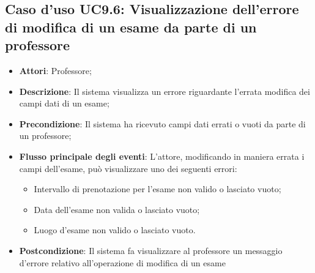 \subsection{Caso d'uso \texorpdfstring{UC9.6}{UC9.6}: Visualizzazione dell'errore di modifica di un esame da parte di un professore}
\begin{itemize}
	\item \textbf{Attori}: Professore;
	\item \textbf{Descrizione}: Il sistema visualizza un errore riguardante l'errata modifica dei campi dati di un esame;
	\item \textbf{Precondizione}: Il sistema ha ricevuto campi dati errati o vuoti da parte di un professore;
	
	\item \textbf{Flusso principale degli eventi}: L'attore, modificando in maniera errata i campi dell'esame, può visualizzare uno dei seguenti errori: \begin{itemize}
		\item Intervallo di prenotazione per l’esame non valido o lasciato vuoto;
		\item Data dell’esame non valida o lasciato vuoto;
		\item Luogo d’esame non valido o lasciato vuoto.
	\end{itemize}
	\item \textbf{Postcondizione}: Il sistema fa visualizzare al professore un messaggio d'errore relativo all'operazione di modifica di un esame
	
\end{itemize}
